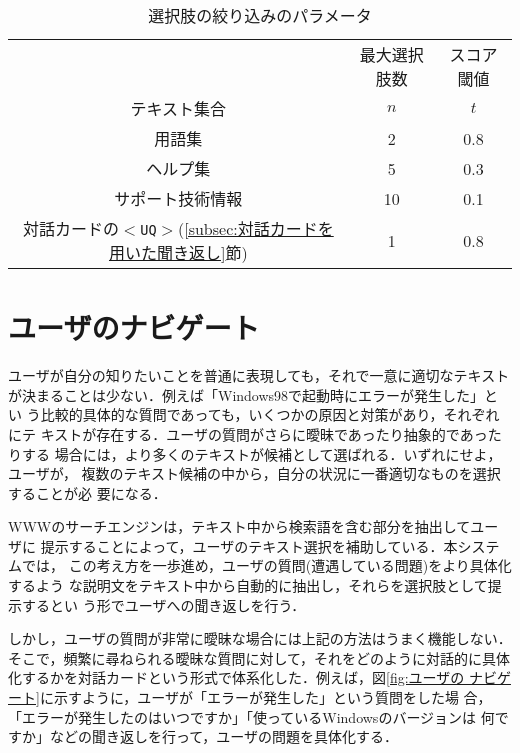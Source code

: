 \begin{table}
 \caption{選択肢の絞り込みのパラメータ} \label{tab:選択肢の絞り込みのパラメータ}
 \footnotesize
 \begin{center}
  \begin{tabular}{c|cc} \hline
   & 最大選択肢数 & スコア閾値 \\
   テキスト集合     & $n$ & $t$ \\ \hline
   用語集           & 2   & 0.8 \\
   ヘルプ集         & 5   & 0.3 \\
   サポート技術情報 & 10  & 0.1 \\ \hline
   対話カードの{\tt $<$UQ$>$}(\ref{subsec:対話カードを用いた聞き返し}節) & 1 & 0.8 \\
   \hline
  \end{tabular}
 \end{center} 
\end{table}



\section{ユーザのナビゲート} \label{sec:ユーザのナビゲート}

ユーザが自分の知りたいことを普通に表現しても，それで一意に適切なテキスト
が決まることは少ない．例えば「Windows98で起動時にエラーが発生した」とい
う比較的具体的な質問であっても，いくつかの原因と対策があり，それぞれにテ
キストが存在する．ユーザの質問がさらに曖昧であったり抽象的であったりする
場合には，より多くのテキストが候補として選ばれる．いずれにせよ，ユーザが，
複数のテキスト候補の中から，自分の状況に一番適切なものを選択することが必
要になる．

WWWのサーチエンジンは，テキスト中から検索語を含む部分を抽出してユーザに
提示することによって，ユーザのテキスト選択を補助している．本システムでは，
この考え方を一歩進め，ユーザの質問(遭遇している問題)をより具体化するよう
な説明文をテキスト中から自動的に抽出し，それらを選択肢として提示するとい
う形でユーザへの聞き返しを行う．

しかし，ユーザの質問が非常に曖昧な場合には上記の方法はうまく機能しない．
そこで，頻繁に尋ねられる曖昧な質問に対して，それをどのように対話的に具体
化するかを対話カードという形式で体系化した．例えば，図\ref{fig:ユーザの
ナビゲート}に示すように，ユーザが「エラーが発生した」という質問をした場
合，「エラーが発生したのはいつですか」「使っているWindowsのバージョンは
何ですか」などの聞き返しを行って，ユーザの問題を具体化する．


